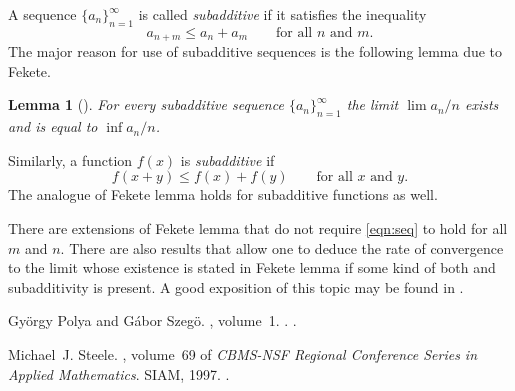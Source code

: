 \documentclass[12pt]{article}
\newtheorem*{lemma}{Lemma}
\begin{document}
A sequence $\{a_n\}_{n=1}^\infty$ is called \emph{subadditive} if
it satisfies the inequality
\begin{equation}\label{eqn:seq}
a_{n+m}\leq a_n+a_m\qquad\text{for all $n$ and $m$}.
\end{equation}
The major reason for use of subadditive sequences is the following
lemma due to Fekete.
\begin{lemma}[\cite{cite:polya_szegoi}]
For every subadditive sequence $\{a_n\}_{n=1}^\infty$ the limit
$\lim a_n/n$ exists and is equal to $\inf a_n/n$.
\end{lemma}

Similarly, a function $f(x)$ is \emph{subadditive} if
\begin{equation*}
f(x+y)\leq f(x)+f(y)\qquad\text{for all $x$ and $y$}.
\end{equation*}
The analogue of Fekete lemma holds for subadditive functions as
well.

There are extensions of Fekete lemma that do not require \eqref{eqn:seq} to hold for all $m$ and $n$. There are also results that allow one to deduce the rate of convergence to the limit whose existence is stated in Fekete lemma if some kind of both  and subadditivity is present. A good exposition of this topic may be found in \cite{cite:steele_azuma}.

\begin{thebibliography}{1}

Gy{\"o}rgy Polya and G{\'a}bor Szeg{\"o}.
, volume~1.
.
\newblock {}.

Michael~J. Steele.
, volume~69 of
  {\em CBMS-NSF Regional Conference Series in Applied Mathematics}.
\newblock SIAM, 1997.
\newblock {}.

\end{thebibliography}
\end{document}
